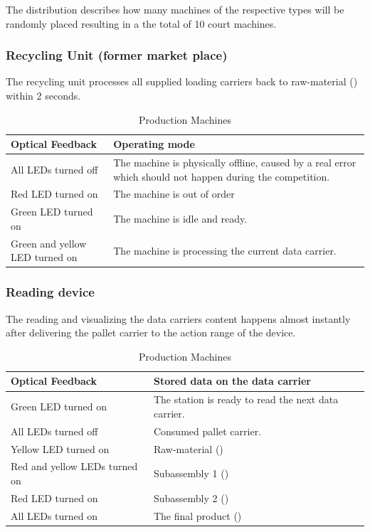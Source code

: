 \documentclass[12pt,twoside]{article}
\begin{document}
The distribution describes how many machines of the respective types
will be randomly placed resulting in a the total of 10 court machines.



\subsubsection{Recycling Unit (former market place)}
The recycling unit processes all supplied loading carriers back to
raw-material () within 2 seconds.

\begin{table}[h]
  \centering
  \begin{tabularx}{\linewidth}{l|X}
    \multicolumn{1}{l}{Optical Feedback} &\multicolumn{1}{l}{Operating
      mode}\\\hline
    All LEDs turned off & 	The machine is physically offline, caused by a real error which should not happen during the competition.\\
    Red LED turned on & 	The machine is out of order\\
    Green LED turned on & 	The machine is idle and ready.\\
    Green and yellow LED turned on & The machine is processing the
    current data carrier.\\\hline
  \end{tabularx}
  \caption{Production Machines}
  \label{tab:production-machines-2}
\end{table}



\subsubsection{Reading device}
The reading and visualizing the data carriers content happens almost
instantly after delivering the pallet carrier to the action range of
the device.

\begin{table}[h]
  \centering
  \begin{tabularx}{\linewidth}{l|X}
    \multicolumn{1}{l}{Optical Feedback} &\multicolumn{1}{l}{Stored
      data on the data carrier}\\\hline
    Green LED turned on &	The station is ready to read the next data carrier.\\
    All LEDs turned off &	Consumed pallet carrier.\\
    Yellow LED turned on &	Raw-material (\s0) \\
    Red and yellow LEDs turned on & 	Subassembly 1 (\s1)\\
    Red LED turned on &	Subassembly 2 (\s2)\\
    All LEDs turned on & The final product (\p{})\\\hline
  \end{tabularx}
  \caption{Production Machines}
  \label{tab:production-machines-2}
\end{table}
\end{document}
